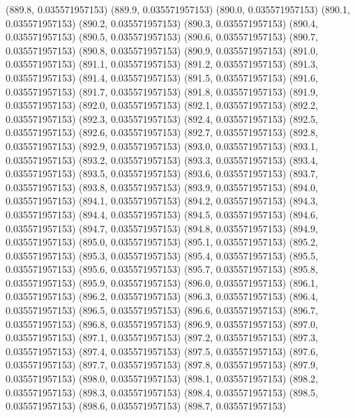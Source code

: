 {					(889.8, 0.035571957153)
					(889.9, 0.035571957153)
					(890.0, 0.035571957153)
					(890.1, 0.035571957153)
					(890.2, 0.035571957153)
					(890.3, 0.035571957153)
					(890.4, 0.035571957153)
					(890.5, 0.035571957153)
					(890.6, 0.035571957153)
					(890.7, 0.035571957153)
					(890.8, 0.035571957153)
					(890.9, 0.035571957153)
					(891.0, 0.035571957153)
					(891.1, 0.035571957153)
					(891.2, 0.035571957153)
					(891.3, 0.035571957153)
					(891.4, 0.035571957153)
					(891.5, 0.035571957153)
					(891.6, 0.035571957153)
					(891.7, 0.035571957153)
					(891.8, 0.035571957153)
					(891.9, 0.035571957153)
					(892.0, 0.035571957153)
					(892.1, 0.035571957153)
					(892.2, 0.035571957153)
					(892.3, 0.035571957153)
					(892.4, 0.035571957153)
					(892.5, 0.035571957153)
					(892.6, 0.035571957153)
					(892.7, 0.035571957153)
					(892.8, 0.035571957153)
					(892.9, 0.035571957153)
					(893.0, 0.035571957153)
					(893.1, 0.035571957153)
					(893.2, 0.035571957153)
					(893.3, 0.035571957153)
					(893.4, 0.035571957153)
					(893.5, 0.035571957153)
					(893.6, 0.035571957153)
					(893.7, 0.035571957153)
					(893.8, 0.035571957153)
					(893.9, 0.035571957153)
					(894.0, 0.035571957153)
					(894.1, 0.035571957153)
					(894.2, 0.035571957153)
					(894.3, 0.035571957153)
					(894.4, 0.035571957153)
					(894.5, 0.035571957153)
					(894.6, 0.035571957153)
					(894.7, 0.035571957153)
					(894.8, 0.035571957153)
					(894.9, 0.035571957153)
					(895.0, 0.035571957153)
					(895.1, 0.035571957153)
					(895.2, 0.035571957153)
					(895.3, 0.035571957153)
					(895.4, 0.035571957153)
					(895.5, 0.035571957153)
					(895.6, 0.035571957153)
					(895.7, 0.035571957153)
					(895.8, 0.035571957153)
					(895.9, 0.035571957153)
					(896.0, 0.035571957153)
					(896.1, 0.035571957153)
					(896.2, 0.035571957153)
					(896.3, 0.035571957153)
					(896.4, 0.035571957153)
					(896.5, 0.035571957153)
					(896.6, 0.035571957153)
					(896.7, 0.035571957153)
					(896.8, 0.035571957153)
					(896.9, 0.035571957153)
					(897.0, 0.035571957153)
					(897.1, 0.035571957153)
					(897.2, 0.035571957153)
					(897.3, 0.035571957153)
					(897.4, 0.035571957153)
					(897.5, 0.035571957153)
					(897.6, 0.035571957153)
					(897.7, 0.035571957153)
					(897.8, 0.035571957153)
					(897.9, 0.035571957153)
					(898.0, 0.035571957153)
					(898.1, 0.035571957153)
					(898.2, 0.035571957153)
					(898.3, 0.035571957153)
					(898.4, 0.035571957153)
					(898.5, 0.035571957153)
					(898.6, 0.035571957153)
					(898.7, 0.035571957153)
}
